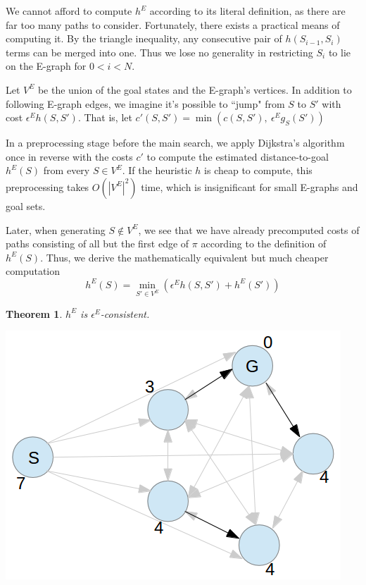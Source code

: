 \documentclass[letterpaper]{article}
\newtheorem{thm}{Theorem}
\begin{document}
We cannot afford to compute $h^E$ according to its literal definition, as there are far too many paths to consider. Fortunately, there exists a practical means of computing it. By the triangle inequality, any consecutive pair of $h(S_{i-1},S_i)$ terms can be merged into one. Thus we lose no generality in restricting $S_i$ to lie on the E-graph for $0 < i < N$.

Let $V^E$ be the union of the goal states and the E-graph's vertices.
In addition to following E-graph edges, we imagine it's possible to ``jump" from $S$ to $S'$ with cost $\epsilon^E h(S,S')$. That is, let $c'(S,S') = \min\left(c(S,S'),~\epsilon^E g_S(S')\right)$


In a preprocessing stage before the main search, we apply Dijkstra's algorithm once in reverse with the costs $c'$ to compute the estimated distance-to-goal $h^E(S)$ from every $S\in V^E$. If the heuristic $h$ is cheap to compute, this preprocessing takes $O(|V^E|^2)$ time, which is insignificant for small E-graphs and goal sets.

Later, when generating $S \notin V^E$, we see that we have already precomputed costs of paths consisting of all but the first edge of $\pi$ according to the definition of $h^E(S)$. Thus, we derive the mathematically equivalent but much cheaper computation
\[h^E(S) = \min_{S'\in V^E} \left(\epsilon^E h(S,S') + h^E(S')\right)\]

\begin{thm}$h^E$ is $\epsilon^E$-consistent. \cite{phillips2012graphs}\end{thm}

\includegraphics[scale=0.4]{Pentagon.png}
\end{document}
